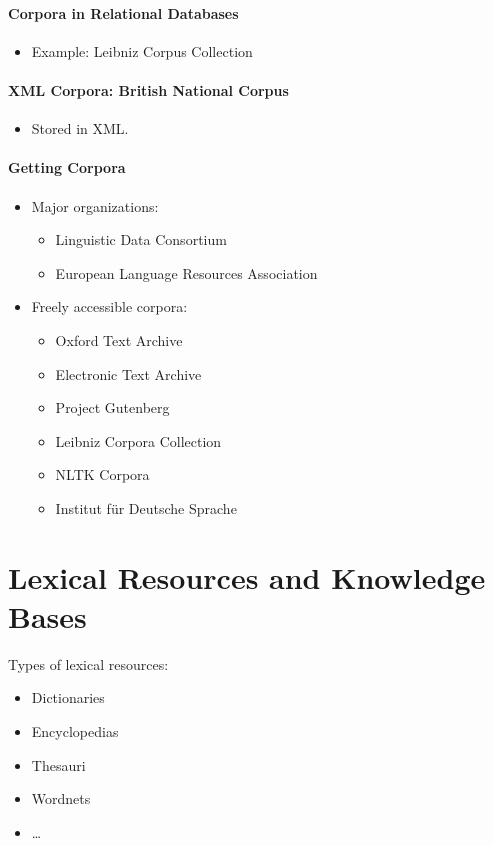 			\paragraph{Corpora in Relational Databases} %
				\begin{itemize}
					\item Example: Leibniz Corpus Collection
				\end{itemize}

            \paragraph{XML Corpora: British National Corpus} %
                \begin{itemize}
                	\item Stored in XML.
                \end{itemize}

            \paragraph{Getting Corpora} %
                \begin{itemize}
                	\item Major organizations:
                		\begin{itemize}
                			\item Linguistic Data Consortium
                			\item European Language Resources Association
                		\end{itemize}
                	\item Freely accessible corpora:
                		\begin{itemize}
                			\item Oxford Text Archive
                			\item Electronic Text Archive
                			\item Project Gutenberg
                			\item Leibniz Corpora Collection
                			\item NLTK Corpora
                			\item Institut für Deutsche Sprache
                		\end{itemize}
                \end{itemize}

    \section{Lexical Resources and Knowledge Bases} %
    	Types of lexical resources:
    	\begin{itemize}
    		\item Dictionaries
    		\item Encyclopedias
    		\item Thesauri
    		\item Wordnets
    		\item \dots
    	\end{itemize}

